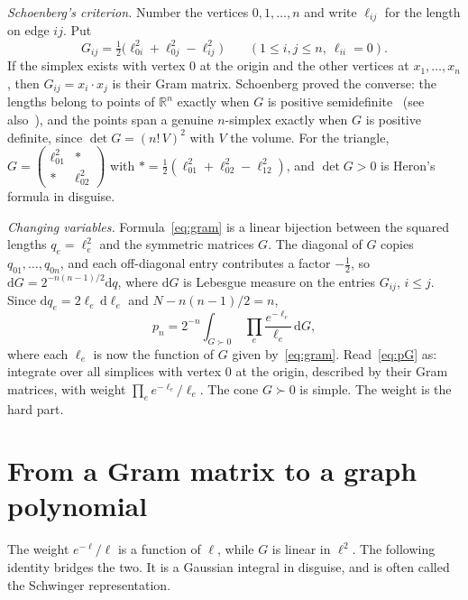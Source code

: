 \documentclass[11pt]{article}
\theoremstyle{remark}
\newcommand{\R}{\mathbb{R}}
\newcommand{\dd}{\mathrm{d}}
\begin{document}
\emph{Schoenberg's criterion.} Number the vertices $0,1,\dots,n$ and write $\ell_{ij}$ for the length on
edge $ij$. Put
\begin{equation}\label{eq:gram}
G_{ij}=\tfrac12\bigl(\ell_{0i}^2+\ell_{0j}^2-\ell_{ij}^2\bigr)\qquad(1\le i,j\le n,\ \ell_{ii}=0).
\end{equation}
If the simplex exists with vertex $0$ at the origin and the other vertices at $x_1,\dots,x_n$, then
$G_{ij}=x_i\cdot x_j$ is their Gram matrix. Schoenberg proved the converse: the lengths belong to points of
$\R^n$ exactly when $G$ is positive semidefinite~\cite{Sch35} (see also~\cite[Section~2]{LLMM14}), and the
points span a genuine $n$-simplex exactly when $G$ is positive definite, since $\det G=(n!\,V)^2$ with $V$
the volume. For the triangle, $G=\begin{pmatrix}\ell_{01}^2 & \ast\\ \ast & \ell_{02}^2\end{pmatrix}$ with
$\ast=\tfrac12(\ell_{01}^2+\ell_{02}^2-\ell_{12}^2)$, and $\det G>0$ is Heron's formula in disguise.

\emph{Changing variables.} Formula~\eqref{eq:gram} is a linear bijection between the squared lengths
$q_e=\ell_e^2$ and the symmetric matrices $G$. The diagonal of $G$ copies $q_{01},\dots,q_{0n}$, and each
off-diagonal entry contributes a factor $-\tfrac12$, so $\dd G=2^{-n(n-1)/2}\dd q$, where $\dd G$ is
Lebesgue measure on the entries $G_{ij}$, $i\le j$. Since $\dd q_e=2\ell_e\,\dd\ell_e$ and
$N-n(n-1)/2=n$,
\begin{equation}\label{eq:pG}
p_n=2^{-n}\int_{G\succ0}\ \prod_e\frac{e^{-\ell_e}}{\ell_e}\,\dd G,
\end{equation}
where each $\ell_e$ is now the function of $G$ given by~\eqref{eq:gram}. Read~\eqref{eq:pG} as: integrate
over all simplices with vertex $0$ at the origin, described by their Gram matrices, with weight
$\prod_e e^{-\ell_e}/\ell_e$. The cone $G\succ0$ is simple. The weight is the hard part.

\section{From a Gram matrix to a graph polynomial}\label{sec:tree}

The weight $e^{-\ell}/\ell$ is a function of $\ell$, while $G$ is linear in $\ell^2$. The following
identity bridges the two. It is a Gaussian integral in disguise, and is often called the Schwinger
representation.
\end{document}
